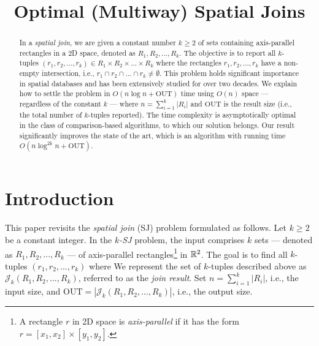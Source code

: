 \documentclass[sigconf]{acmart}
\def\J{\mathcal{J}}
\def\out{\mathrm{OUT}}
\begin{document}
    
\title{Optimal (Multiway) Spatial Joins}


\author{}


\begin{abstract}
    In a {\em spatial join}, we are given a constant number $k \geq 2$ of sets containing axis-parallel rectangles in a 2D space, denoted as $R_1, R_2, ..., R_k$. The objective is to report all $k$-tuples $(r_1, r_2, ..., r_k) \in R_1 \times R_2 \times ... \times R_k$ where the rectangles $r_1, r_2, ..., r_k$ have a non-empty intersection, i.e., $r_1 \cap r_2 \cap ... \cap r_k \neq \emptyset$. This problem holds significant importance in spatial databases and has been extensively studied for over two decades. We explain how to settle the problem in $O(n \log n + \out)$ time using $O(n)$ space --- regardless of the constant $k$ --- where $n = \sum_{i=1}^k |R_i|$ and $\out$ is the result size (i.e., the total number of $k$-tuples reported). The time complexity is asymptotically optimal in the class of comparison-based algorithms, to which our solution belongs. Our result significantly improves the state of the art, which is an algorithm with running time $O(n \log^{2k} n + \out)$.
\end{abstract}

\maketitle 

\section{Introduction} \label{sec:intro}

This paper revisits the {\em spatial join} (SJ) problem formulated as follows. Let $k \ge 2$ be a constant integer. In the {\em $k$-SJ} problem, the input comprises $k$ sets --- denoted as $R_1, R_2, ..., R_k$ --- of axis-parallel rectangles\footnote{A rectangle $r$ in 2D space is {\em axis-parallel} if it has the form $r = [x_1, x_2] \times [y_1, y_2]$.} in $\mathbb{R}^2$. The goal is to find all $k$-tuples $(r_1, r_2, ..., r_k)$ where
We represent the set of $k$-tuples described above as $\J_k(R_1, R_2, ..., R_k)$, referred to as the {\em join result}. Set $n = \sum_{i=1}^k |R_i|$, i.e., the input size, and $\out = |\J_k(R_1, R_2, ..., R_k)|$, i.e., the output size.
\end{document}
